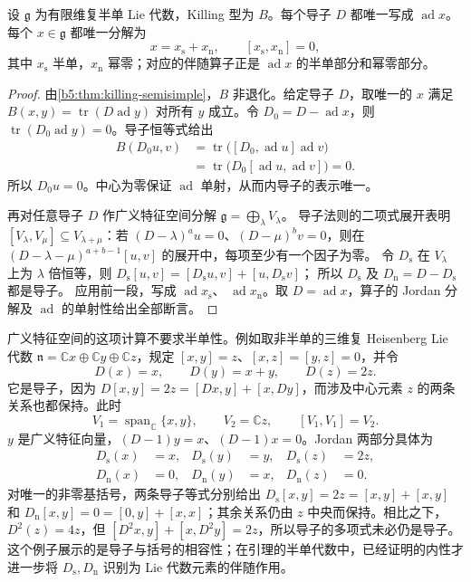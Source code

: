 \begin{lemma}\label{b5:lem:inner-derivations-jordan}
	设 \(\mathfrak g\) 为有限维复半单 Lie 代数，Killing 型为 \(B\)。每个导子 \(D\) 都唯一写成 \(\operatorname{ad}x\)。每个 \(x\in\mathfrak g\) 都唯一分解为
	\[
		x=x_{\mathrm s}+x_{\mathrm n},\qquad [x_{\mathrm s},x_{\mathrm n}]=0,
	\]
	其中 \(x_{\mathrm s}\) 半单，\(x_{\mathrm n}\) 幂零；对应的伴随算子正是 \(\operatorname{ad}x\) 的半单部分和幂零部分。
\end{lemma}
\begin{proof}
	由\cref{b5:thm:killing-semisimple}，\(B\) 非退化。给定导子 \(D\)，取唯一的 \(x\) 满足 \(B(x,y)=\operatorname{tr}(D\operatorname{ad}y)\) 对所有 \(y\) 成立。令 \(D_0=D-\operatorname{ad}x\)，则 \(\operatorname{tr}(D_0\operatorname{ad}y)=0\)。导子恒等式给出
	\[
		\begin{aligned}
			B(D_0u,v) &=\operatorname{tr}\bigl([D_0,\operatorname{ad}u]\operatorname{ad}v\bigr)\\
			&=\operatorname{tr}\bigl(D_0[\operatorname{ad}u,\operatorname{ad}v]\bigr)=0.
		\end{aligned}
	\]
	所以 \(D_0u=0\)。中心为零保证 \(\operatorname{ad}\) 单射，从而内导子的表示唯一。

	再对任意导子 \(D\) 作广义特征空间分解 \(\mathfrak g=\bigoplus_\lambda V_\lambda\)。 导子法则的二项式展开表明 \([V_\lambda,V_\mu]\subseteq V_{\lambda+\mu}\)：若 \((D-\lambda)^a u=0\)、\((D-\mu)^b v=0\)，则在 \((D-\lambda-\mu)^{a+b-1}[u,v]\) 的展开中，每项至少有一个因子为零。 令 \(D_{\mathrm s}\) 在 \(V_\lambda\) 上为 \(\lambda\) 倍恒等，则 \(D_{\mathrm s}[u,v]=[D_{\mathrm s}u,v]+[u,D_{\mathrm s}v]\)； 所以 \(D_{\mathrm s}\) 及 \(D_{\mathrm n}=D-D_{\mathrm s}\) 都是导子。 应用前一段，写成 \(\operatorname{ad}x_{\mathrm s}\)、 \(\operatorname{ad}x_{\mathrm n}\)。取 \(D=\operatorname{ad}x\)，算子的 Jordan 分解及 \(\operatorname{ad}\) 的单射性给出全部断言。
\end{proof}

广义特征空间的这项计算不要求半单性。例如取非半单的三维复 Heisenberg Lie 代数 \(\mathfrak n=\mathbb Cx\oplus\mathbb Cy\oplus\mathbb Cz\)，规定 \([x,y]=z\)、\([x,z]=[y,z]=0\)，并令
\[
	D(x)=x,\qquad D(y)=x+y,\qquad D(z)=2z.
\]
它是导子，因为 \(D[x,y]=2z=[Dx,y]+[x,Dy]\)，而涉及中心元素 \(z\) 的两条关系也都保持。此时
\[
	V_1=\operatorname{span}_{\mathbb C}\{x,y\},\qquad V_2=\mathbb Cz,\qquad [V_1,V_1]=V_2.
\]
\(y\) 是广义特征向量，\((D-1)y=x\)、\((D-1)x=0\)。Jordan 两部分具体为
\[
	\begin{aligned}
		D_{\mathrm s}(x)&=x,&D_{\mathrm s}(y)&=y,&D_{\mathrm s}(z)&=2z,\\
		D_{\mathrm n}(x)&=0,&D_{\mathrm n}(y)&=x,&D_{\mathrm n}(z)&=0.
	\end{aligned}
\]
对唯一的非零基括号，两条导子等式分别给出 \(D_{\mathrm s}[x,y]=2z=[x,y]+[x,y]\) 和 \(D_{\mathrm n}[x,y]=0=[0,y]+[x,x]\)；其余关系仍由 \(z\) 中央而保持。相比之下，\(D^2(z)=4z\)，但 \([D^2x,y]+[x,D^2y]=2z\)，所以导子的多项式未必仍是导子。这个例子展示的是导子与括号的相容性；在引理的半单代数中，已经证明的内性才进一步将 \(D_{\mathrm s},D_{\mathrm n}\) 识别为 Lie 代数元素的伴随作用。

